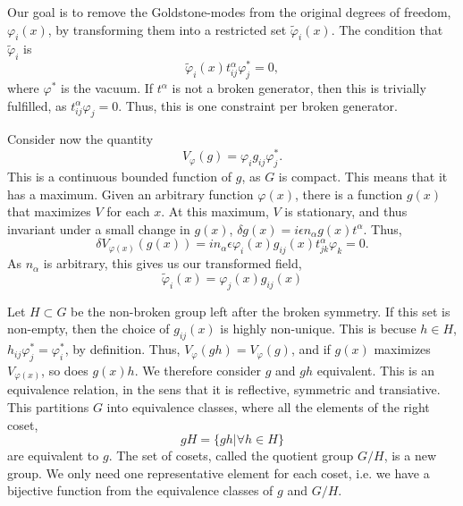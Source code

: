 \documentclass{article}
\begin{document}
Our goal is to remove the Goldstone-modes from the original degrees of freedom, $\varphi_i(x)$, by transforming them into a restricted set $\tilde \varphi_i(x)$.
The condition that $\tilde \varphi_i$ is 
\begin{equation}
    \tilde \varphi_i(x) t^\alpha_{ij} \varphi^*_{j} = 0,
\end{equation}
where $\varphi^*$ is the vacuum.
If $t^\alpha$ is not a broken generator, then this is trivially fulfilled, as $t^\alpha _{ij}\varphi_{j} = 0$.
Thus, this is one constraint per broken generator. 

Consider now the quantity
\begin{equation}
    V_{\varphi}(g) = \varphi_i g_{ij} \varphi^*_j.
\end{equation}
This is a continuous bounded function of $g$, as $G$ is compact.
This means that it has a maximum.
Given an arbitrary function $\varphi(x)$, there is a function $g(x)$ that maximizes $V$ for each $x$.
At this maximum, $V$ is stationary, and thus invariant under a small change in $g(x)$, 
$\delta g(x) = i \epsilon n_\alpha g(x) t^\alpha$.
Thus,
\begin{equation}
    \delta V_{\varphi(x)}(g(x)) = i n_\alpha \epsilon \varphi_i(x) g_{ij}(x) t^\alpha_{jk} \varphi_k = 0.
\end{equation}
As $n_\alpha$ is arbitrary, this gives us our transformed field,
\begin{equation}
    \tilde \varphi_i(x) = \varphi_j(x) g_{ij}(x)
\end{equation}

Let $H \subset G$ be the non-broken group left after the broken symmetry.
If this set is non-empty, then the choice of $g_{ij}(x)$ is highly non-unique.
This is becuse $h \in H$, $h_{ij} \varphi^*_j = \varphi^*_i$, by definition. 
Thus, $V_\varphi(gh) = V_\varphi(g)$, and if $g(x)$ maximizes $V_{\varphi(x)}$, so does $g(x)h$.
We therefore consider $g$ and $gh$ equivalent.
This is an equivalence relation, in the sens that it is reflective, symmetric and transiative.
This partitions $G$ into equivalence classes, where all the elements of the right coset,
\begin{equation}
    gH = \{g h| \forall h \in H  \}
\end{equation}
are equivalent to $g$.
The set of cosets, called the quotient group $G / H$, is a new group.
We only need one representative element for each coset, i.e. we have a bijective function from the equivalence classes of $g$ and $G / H$.
\end{document}
